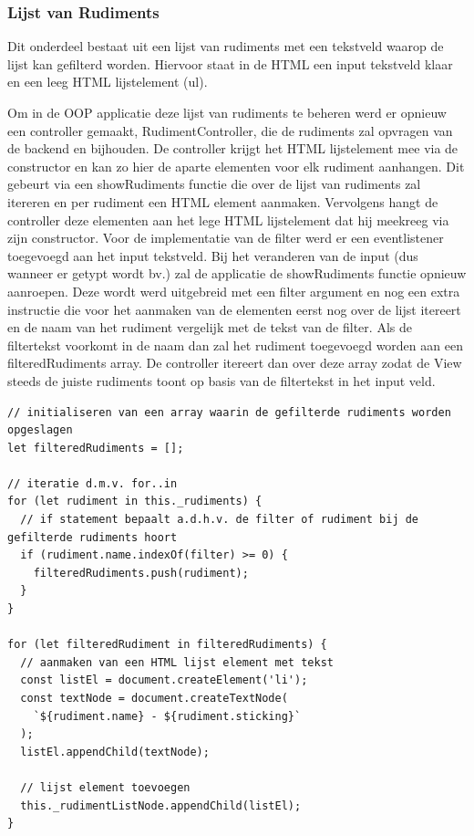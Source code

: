  \subsubsection{Lijst van Rudiments}
 Dit onderdeel bestaat uit een lijst van rudiments met een tekstveld waarop de lijst kan gefilterd worden. Hiervoor staat in de HTML een input tekstveld klaar en een leeg HTML lijstelement (ul). 
 
 Om in de OOP applicatie deze lijst van rudiments te beheren werd er opnieuw een controller gemaakt, RudimentController, die de rudiments zal opvragen van de backend en bijhouden. De controller krijgt het HTML lijstelement mee via de constructor en kan zo hier de aparte elementen voor elk rudiment aanhangen. Dit gebeurt via een showRudiments functie die over de lijst van rudiments zal itereren en per rudiment een HTML element aanmaken. Vervolgens hangt de controller deze elementen aan het lege HTML lijstelement dat hij meekreeg via zijn constructor. Voor de implementatie van de filter werd er een eventlistener toegevoegd aan het input tekstveld. Bij het veranderen van de input (dus wanneer er getypt wordt bv.) zal de applicatie de showRudiments functie opnieuw aanroepen. Deze wordt werd uitgebreid met een filter argument en nog een extra instructie die voor het aanmaken van de elementen eerst nog over de lijst itereert en de naam van het rudiment vergelijk met de tekst van de filter. Als de filtertekst voorkomt in de naam dan zal het rudiment toegevoegd worden aan een filteredRudiments array. De controller itereert dan over deze array zodat de View steeds de juiste rudiments toont op basis van de filtertekst in het input veld. 
 
\begin{lstlisting}[caption=Filteren van de rudiments - OOP]
// initialiseren van een array waarin de gefilterde rudiments worden opgeslagen
let filteredRudiments = [];

// iteratie d.m.v. for..in
for (let rudiment in this._rudiments) {
  // if statement bepaalt a.d.h.v. de filter of rudiment bij de gefilterde rudiments hoort
  if (rudiment.name.indexOf(filter) >= 0) {
    filteredRudiments.push(rudiment);
  }
}

for (let filteredRudiment in filteredRudiments) {
  // aanmaken van een HTML lijst element met tekst
  const listEl = document.createElement('li');
  const textNode = document.createTextNode(
    `${rudiment.name} - ${rudiment.sticking}`
  );
  listEl.appendChild(textNode);

  // lijst element toevoegen 
  this._rudimentListNode.appendChild(listEl);
}
\end{lstlisting}

